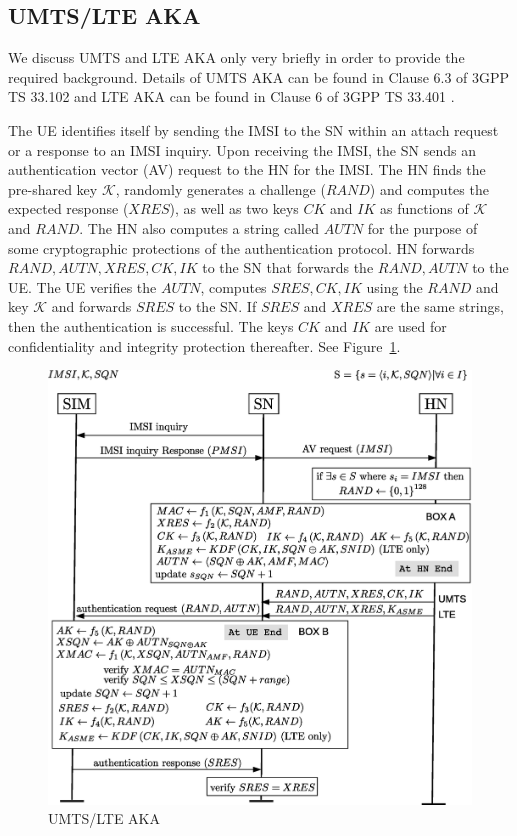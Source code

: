 \documentclass{llncs} %
\begin{document}
\subsection{UMTS/LTE AKA}
We discuss UMTS and LTE AKA only very briefly in order to provide the required background. Details of UMTS AKA can be found in Clause 6.3 of 3GPP TS 33.102 \cite{TS33102} and LTE AKA can be found in Clause 6 of 3GPP TS 33.401 \cite{TS33401}. 

The UE identifies itself by sending the IMSI to the SN within an attach request or a response to an IMSI inquiry. Upon receiving the IMSI, the SN sends an authentication vector (AV) request to the HN for the IMSI. The HN finds the pre-shared key $\mathcal{K}$, randomly generates a challenge ($RAND$) and computes the expected response ($XRES$), as well as two keys $CK$ and $IK$ as functions of $\mathcal{K}$ and $RAND$. The HN also computes a string called $AUTN$ for the purpose of some cryptographic protections of the authentication protocol. HN forwards $RAND,AUTN,XRES, CK,IK$ to the SN that forwards the $RAND,AUTN$ to the UE. The UE verifies the $AUTN$, computes $SRES,CK,IK$ using the $RAND$ and key $\mathcal{K}$ and forwards $SRES$ to the SN. If $SRES$ and $XRES$ are the same strings, then the authentication is successful. The keys $CK$ and $IK$ are used for confidentiality and integrity protection thereafter. See Figure~\ref{fig:UMTS_LTE_AKA}.

\begin{figure}[]
  \centering
    \includegraphics[scale=0.32, clip=true, trim=0cm 0cm 0cm 1cm]{UMTS_LTE_AKA.eps}
  \caption{UMTS/LTE AKA}
  \label{fig:UMTS_LTE_AKA}
\end{figure}
\end{document}
